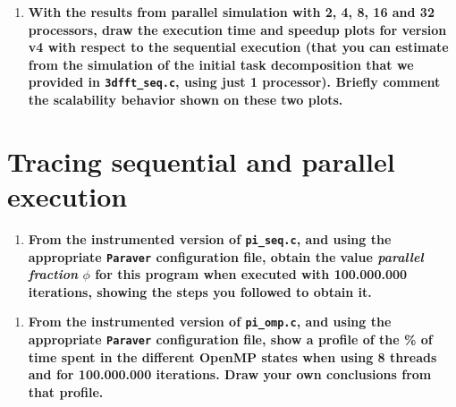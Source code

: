 \documentclass[a4paper]{article}
\begin{document}
\begin{enumerate}[resume]
	\item \textbf{With the results from parallel simulation with 2, 4, 8, 16 and 32 processors, draw the execution time and speedup plots for version v4 with respect to the sequential execution (that you can estimate from the simulation of the initial task decomposition that we provided in \texttt{3dfft\_seq.c}, using just 1 processor). Briefly comment the scalability behavior shown on these two plots.}
\end{enumerate}

\section*{Tracing sequential and parallel execution}

\begin{enumerate}[resume]
	\item \textbf{From the instrumented version of \texttt{pi\_seq.c}, and using the appropriate \texttt{Paraver} configuration file, obtain the value \textit{parallel fraction} $\phi$ for this program when executed with 100.000.000 iterations, showing the steps you followed to obtain it.}
\end{enumerate}

\begin{enumerate}[resume]
	\item \textbf{From the instrumented version of \texttt{pi\_omp.c}, and using the appropriate \texttt{Paraver} configuration file, show a profile of the \% of time spent in the different OpenMP states when using 8 threads and for 100.000.000 iterations. Draw your own conclusions from that profile.}
\end{enumerate}
\end{document}
